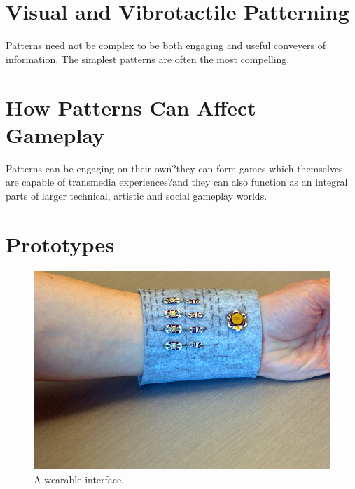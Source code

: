 \documentclass{chi-ext}
\begin{document}


\section{Visual and Vibrotactile Patterning}
Patterns need not be complex to be both engaging and useful conveyers of information. The simplest patterns are often the most compelling. 

\section{How Patterns Can Affect Gameplay}
Patterns can be engaging on their own?they can form games which themselves are capable of transmedia experiences?and they can also function as an integral parts of larger technical, artistic and social gameplay worlds. 


\section{Prototypes}
\begin{figure}
  \begin{center}
  \includegraphics[width=\columnwidth]{images/P1130375.jpg}
  \caption{A wearable interface.}
  \label{fig:marginparsample}
  \end{center}  
\end{figure}
\end{document}
